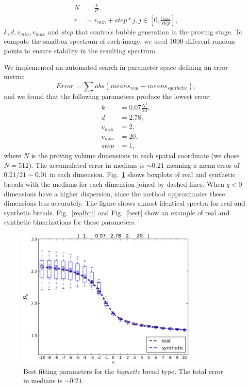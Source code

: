 \begin{align*}
N &= \frac{k}{r^{d}},\\ r &= v_{min}+step*j, j \in [0,\frac{v_{max}}{step}],
\end{align*}
$k,d,v_{min},v_{max}$ and $step$ that controls bubble generation in the proving stage.
To compute the sandbox spectrum of each image, we used $1000$ different random points to ensure stability in the resulting spectrum.

We implemented an automated search in parameter space defining an error metric: 
\begin{equation*}
Error = \displaystyle \sum abs(means_{real}-means_{synthetic}),
\end{equation*}
and we found that the following parameters produce the lowest error:
\begin{align*}
k &= 0.07 \frac{N^{3}}{20} ,\\
d &=2.78,\\
v_{min} &=2,\\
v_{max} &=20.\\
step &=1,
\end{align*}
where $N$ is the proving volume dimensions in each spatial coordinate (we chose $N = 512$). 
The accumulated error in medians is $\sim 0.21$ meaning a mean error of $0.21/21 \sim 0.01$ in each dimension.
Fig.~\ref{bestboxplot} shows boxplots of real and synthetic breads with the medians for each dimension joined by dashed lines.
When $q < 0$ dimensions have a higher dispersion, since the method approximates these dimensions less accurately.
The figure shows almost identical spectra for real and synthetic breads. Fig.~\ref{realbin} and Fig.~\ref{best} show an example of real and synthetic binarizations for these parameters.


\begin{figure}[!ht]
\includegraphics[width=9cm]{figures/bestboxplot}
\caption{Best fitting parameters for the {\em baguette} bread type. The total error in medians is $\sim 0.21$.}
\label{bestboxplot}
\end{figure}

